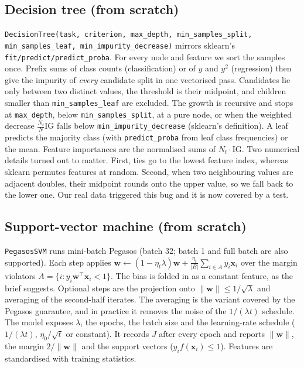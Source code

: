 \documentclass[10pt,twocolumn,a4paper]{article}
\begin{document}
\subsection{Decision tree (from scratch)}
\texttt{DecisionTree(task, criterion, max\_depth, min\_samples\_split, min\_samples\_leaf,
min\_impurity\_decrease)} mirrors sklearn's \texttt{fit/predict/predict\_proba}. For every node and feature
we sort the samples once. Prefix sums of class counts (classification) or of $y$ and $y^2$ (regression)
then give the impurity of \emph{every} candidate split in one vectorised pass. Candidates lie only between two
distinct values, the threshold is their midpoint, and children smaller than \texttt{min\_samples\_leaf}
are excluded. The growth is recursive and stops at \texttt{max\_depth}, below \texttt{min\_samples\_split},
at a pure node, or when the weighted decrease $\tfrac{N_t}{N}\mathrm{IG}$ falls below
\texttt{min\_impurity\_decrease} (sklearn's definition). A leaf predicts the majority class (with
\texttt{predict\_proba} from leaf class frequencies) or the mean. Feature importances are the normalised
sums of $N_t\cdot\mathrm{IG}$. Two numerical details turned out to matter. First, ties go to the lowest feature index, whereas
sklearn permutes features at random. Second, when two neighbouring values are adjacent doubles, their
midpoint rounds onto the upper value, so we fall back to the lower one. Our real data triggered this bug and it is
now covered by a test.

\subsection{Support-vector machine (from scratch)}
\texttt{PegasosSVM} runs mini-batch Pegasos (batch 32; batch 1 and full batch are also supported). Each
step applies $\mathbf{w}\leftarrow(1-\eta_t\lambda)\mathbf{w}+\tfrac{\eta_t}{|B|}\sum_{i\in A}y_i\mathbf{x}_i$
over the margin violators $A=\{i:y_i\mathbf{w}^{\top}\mathbf{x}_i<1\}$. The bias is folded in as a constant
feature, as the brief suggests. Optional steps are the projection onto $\lVert\mathbf{w}\rVert\le1/\sqrt\lambda$
and averaging of the second-half iterates. The averaging is the variant covered by the Pegasos guarantee, and in practice it removes the
noise of the $1/(\lambda t)$ schedule. The model exposes $\lambda$, the epochs, the batch size and the learning-rate schedule
($1/(\lambda t)$, $\eta_0/\sqrt t$ or constant). It records $J$ after every epoch and reports $\lVert\mathbf{w}\rVert$, the margin $2/\lVert\mathbf{w}\rVert$
and the support vectors ($y_i f(\mathbf{x}_i)\le1$). Features are standardised with training statistics.
\end{document}
